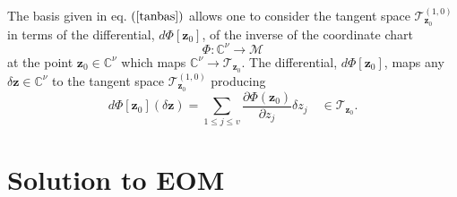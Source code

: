 \documentclass[aps,preprint]{revtex4}%
\begin{document}
The basis given in eq. $\left(  \ref{tanbas}\right)  $ allows one to consider
the tangent space $\mathcal{T}_{\mathbf{z}_{0}}^{\left(  1,0\right)  }$ in
terms of the differential, $d\Phi\left[  \mathbf{z}_{0}\right]  $, of the
inverse of the coordinate chart
\begin{equation}
\Phi:\mathbb{C}^{\nu}\rightarrow\mathcal{M}%
\end{equation}
at the point $\mathbf{z}_{0}\in\mathbb{C}^{\nu}$ which maps $\mathbb{C}^{\nu
}\rightarrow\mathcal{T}_{\mathbf{z}_{0}}$. The differential, $d\Phi\left[
\mathbf{z}_{0}\right]  $, maps any $\delta\mathbf{z\in}\mathbb{C}^{\nu}$ to
the tangent space $\mathcal{T}_{\mathbf{z}_{0}}^{\left(  1,0\right)  }$
producing
\begin{equation}
d\Phi\left[  \mathbf{z}_{0}\right]  \left(  \delta\mathbf{z}\right)
=\sum_{1\leq j\leq v}\frac{\partial\Phi\left(  \mathbf{z}_{0}\right)
}{\partial z_{j}}\delta z_{j}\quad\in\mathcal{T}_{\mathbf{z}_{0}}.
\end{equation}


\section{Solution to EOM\label{solution}}
\end{document}
